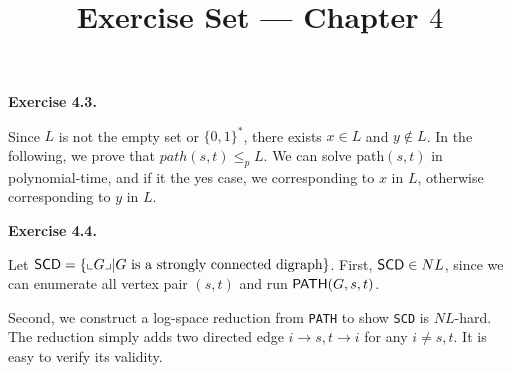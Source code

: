 \documentclass[a4paper]{article}
\title{Exercise Set --- Chapter $4$}
\date{}
\newenvironment{exercise}[1]{
	\par
	\noindent\textbf{Exercise #1.}\quad
}{
	\par
	\bigskip
}
\newcommand{\cbra}[1]{\left\{ #1 \right\}}
\begin{document}
\maketitle


\begin{exercise}{4.3}
Since $L$ is not the empty set or $\{0,1\}^{*}$, there exists $x\in L$ and $y\not\in L$. In the following, we prove that $path(s,t)\leq_{p} L$. We can solve path$(s,t)$ in polynomial-time, and if it the yes case, we corresponding to $x$ in $L$, otherwise corresponding to $y$ in $L$.
\end{exercise}

\begin{exercise}{4.4}
    Let $\texttt{\sf SCD}=\cbra{\llcorner G\lrcorner\middle| G\text{ is a strongly connected digraph}}$.
    First, $\texttt{\sf SCD}\in NL$, since we can enumerate all vertex pair $(s,t)$ and run $\texttt{\sf PATH}(G,s,t)$.

    Second, we construct a log-space reduction from \texttt{\sf PATH} to show \texttt{\sf SCD} is $NL$-hard.
    The reduction simply adds two directed edge $i\to s,t\to i$ for any $i\neq s,t$. 
    It is easy to verify its validity.
\end{exercise}
\end{document}

